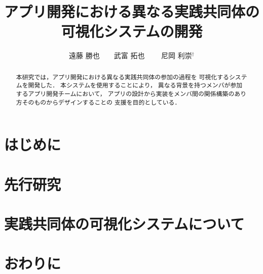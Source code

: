 \documentclass[twoside]{wiss}
\begin{document}
\title{アプリ開発における異なる実践共同体の可視化システムの開発}
\etitle{}%
%
%
%
\author{遠藤 勝也　　武富 拓也
　　尼岡 利崇${}^\dag$}

\begin{abstract}
本研究では，アプリ開発における異なる実践共同体の参加の過程を
可視化するシステムを開発した．
本システムを使用することにより，
異なる背景を持つメンバが参加するアプリ開発チームにおいて，
アプリの設計から実装をメンバ間の関係構築のあり方そのものからデザインすることの
支援を目的としている．
\end{abstract}

\maketitle

\section{はじめに}
\label{introduction}


\section{先行研究}
\label{preResearch}


\section{実践共同体の可視化システムについて}
\label{system}


\section{おわりに}
\label{conclusion}



\end{document}
